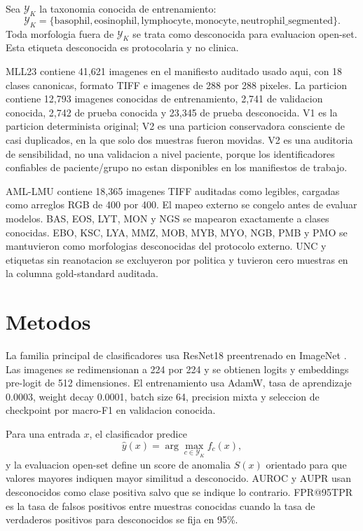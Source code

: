 \documentclass[11pt]{article}
\begin{document}
Sea $\mathcal{Y}_K$ la taxonomia conocida de entrenamiento:
\[
\mathcal{Y}_K=\{\text{basophil},\text{eosinophil},\text{lymphocyte},\text{monocyte},\text{neutrophil\_segmented}\}.
\]
Toda morfologia fuera de $\mathcal{Y}_K$ se trata como desconocida para evaluacion open-set. Esta etiqueta desconocida es protocolaria y no clinica.

MLL23 contiene 41,621 imagenes en el manifiesto auditado usado aqui, con 18 clases canonicas, formato TIFF e imagenes de 288 por 288 pixeles. La particion contiene 12,793 imagenes conocidas de entrenamiento, 2,741 de validacion conocida, 2,742 de prueba conocida y 23,345 de prueba desconocida. V1 es la particion determinista original; V2 es una particion conservadora consciente de casi duplicados, en la que solo dos muestras fueron movidas. V2 es una auditoria de sensibilidad, no una validacion a nivel paciente, porque los identificadores confiables de paciente/grupo no estan disponibles en los manifiestos de trabajo.

AML-LMU contiene 18,365 imagenes TIFF auditadas como legibles, cargadas como arreglos RGB de 400 por 400. El mapeo externo se congelo antes de evaluar modelos. BAS, EOS, LYT, MON y NGS se mapearon exactamente a clases conocidas. EBO, KSC, LYA, MMZ, MOB, MYB, MYO, NGB, PMB y PMO se mantuvieron como morfologias desconocidas del protocolo externo. UNC y etiquetas sin reanotacion se excluyeron por politica y tuvieron cero muestras en la columna gold-standard auditada.

\section{Metodos}

La familia principal de clasificadores usa ResNet18 preentrenado en ImageNet \cite{he2016resnet}. Las imagenes se redimensionan a 224 por 224 y se obtienen logits y embeddings pre-logit de 512 dimensiones. El entrenamiento usa AdamW, tasa de aprendizaje 0.0003, weight decay 0.0001, batch size 64, precision mixta y seleccion de checkpoint por macro-F1 en validacion conocida.

Para una entrada $x$, el clasificador predice
\[
\hat{y}(x)=\arg\max_{c\in\mathcal{Y}_K} f_c(x),
\]
y la evaluacion open-set define un score de anomalia $S(x)$ orientado para que valores mayores indiquen mayor similitud a desconocido. AUROC y AUPR usan desconocidos como clase positiva salvo que se indique lo contrario. FPR@95TPR es la tasa de falsos positivos entre muestras conocidas cuando la tasa de verdaderos positivos para desconocidos se fija en 95\%.
\end{document}
